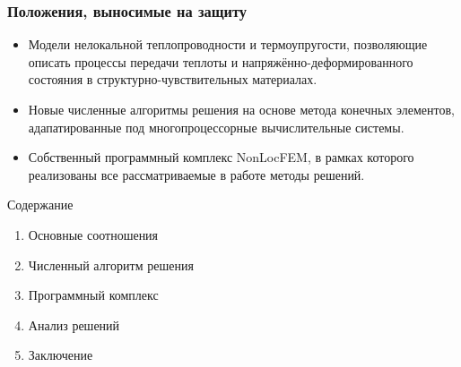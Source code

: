 \begin{frame}
    \setcounter{framenumber}{1}
    \maketitle
\end{frame}

\begin{frame}
    \frametitle{Положения, выносимые на защиту}
    \begin{itemize}
    	\justifying
        \item Модели нелокальной теплопроводности и термоупругости, позволяющие описать процессы передачи теплоты и напряжённо-деформированного состояния в структурно-чувствительных материалах.
        \item Новые численные алгоритмы решения на основе метода конечных элементов, адапатированные под многопроцессорные вычислительные системы.
        \item Собственный программный комплекс NonLocFEM, в рамках которого реализованы все рассматриваемые в работе методы решений.
    \end{itemize}
\end{frame}

\begin{frame}{Содержание}
	\LARGE
	\begin{enumerate}
		\item Основные соотношения
		\item Численный алгоритм решения
		\item Программный комплекс
		\item Анализ решений
		\item Заключение
	\end{enumerate}
\end{frame}
%
%
%
%
